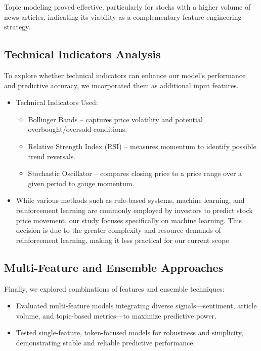 \documentclass[twocolumn]{article}
\begin{document}
Topic modeling proved effective, particularly for stocks with a higher volume of news articles, indicating its viability as a complementary feature engineering strategy.

\subsection{Technical Indicators Analysis}
To explore whether technical indicators can enhance our model's performance and predictive accuracy, we incorporated them as additional input features.
\begin{itemize}
    \item Technical Indicators Used:
    \begin{itemize}
    \item Bollinger Bands – captures price volatility and potential overbought/oversold conditions.

    \item Relative Strength Index (RSI) – measures momentum to identify possible trend reversals.

    \item Stochastic Oscillator – compares closing price to a price range over a given period to gauge momentum.
    \end{itemize}
    \item While various methods such as rule-based systems, machine learning, and reinforcement learning are commonly employed by investors to predict stock price movement, our study focuses specifically on machine learning. This decision is due to the greater complexity and resource demands of reinforcement learning, making it less practical for our current scope
\end{itemize}

\subsection{Multi-Feature and Ensemble Approaches}
Finally, we explored combinations of features and ensemble techniques:
\begin{itemize}
    \item Evaluated multi-feature models integrating diverse signals—sentiment, article volume, and topic-based metrics—to maximize predictive power.
    \item Tested single-feature, token-focused models for robustness and simplicity, demonstrating stable and reliable predictive performance.
\end{itemize}
\end{document}
